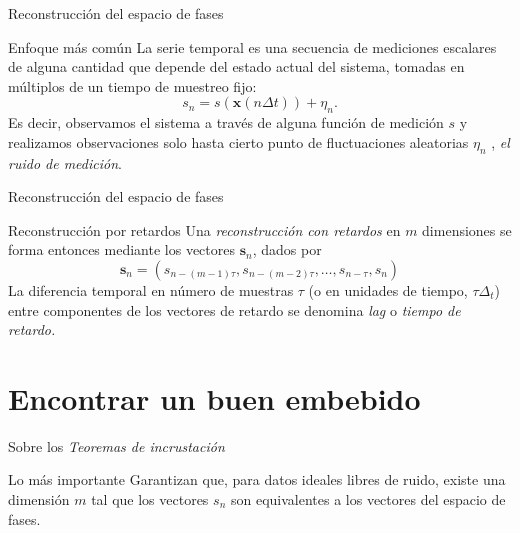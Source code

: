 \documentclass[11pt]{beamer}
\begin{document}
\begin{frame}{Reconstrucción del espacio de fases}
	\small
	\begin{block}{Enfoque más común}
		 La serie temporal es una secuencia de mediciones escalares de alguna cantidad que depende del estado actual del sistema, tomadas en múltiplos de un tiempo de muestreo fijo:
		\begin{equation}
			s_n = s(\mathbf{x}(n\Delta t)) + \eta_n .
		\end{equation}
		Es decir, observamos el sistema a través de alguna función de medición $s$ y realizamos observaciones solo hasta cierto punto de fluctuaciones aleatorias $\eta_n$ , \textit{el ruido de medición}.
	\end{block}	
\end{frame}

\begin{frame}{Reconstrucción del espacio de fases}
	\begin{block}{Reconstrucción por retardos}
		Una \textit{reconstrucción con retardos} en $m$ dimensiones se forma entonces mediante los vectores $\mathbf{s}_n$, dados por
		\begin{equation}
			\mathbf{s}_n = (s_{n-(m-1)\tau}, s_{n-(m-2)\tau}, \ldots, s_{n-\tau}, s_n) 
		\end{equation}
		La diferencia temporal en número de muestras $\tau$ (o en unidades de tiempo, $\tau \Delta_t$) entre componentes de los vectores de retardo se denomina \textit{lag} o \textit{tiempo de retardo.}
	\end{block}
\end{frame}

\section{Encontrar un buen embebido}
\begin{frame} 
\tableofcontents[currentsection] %
\end{frame}

\begin{frame}{Sobre los \textit{Teoremas de incrustación}}
	\begin{block}{Lo más importante}
		Garantizan que, para datos ideales libres de ruido, existe una dimensión $m$ tal que los vectores $s_n$ son equivalentes a los vectores del espacio de fases.
	\end{block}

\end{frame}
\end{document}
